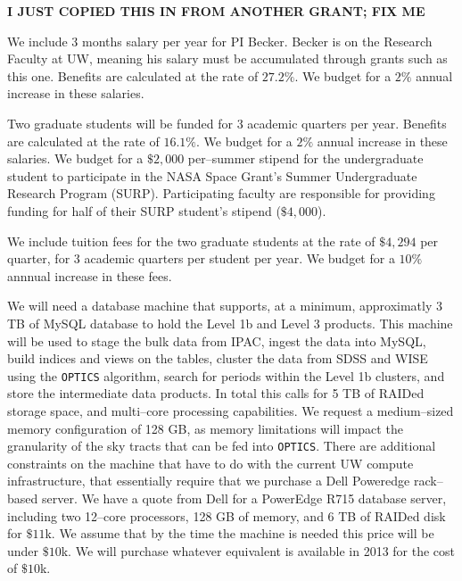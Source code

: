 {\bf I JUST COPIED THIS IN FROM ANOTHER GRANT; FIX ME}

\bigskip {} 

We include 3 months salary per year for PI Becker. Becker is on the
Research Faculty at UW, meaning his salary must be accumulated through
grants such as this one.  Benefits are calculated at the rate of
$27.2\%$.  We budget for a $2\%$ annual increase in these salaries.

\bigskip {} 

Two graduate students will be funded for 3 academic quarters per year.
Benefits are calculated at the rate of $16.1\%$.  We budget for a
$2\%$ annual increase in these salaries.  We budget for a $\$2,000$
per--summer stipend for the undergraduate student to participate in
the NASA Space Grant's Summer Undergraduate Research Program (SURP).
Participating faculty are responsible for providing funding for half
of their SURP student's stipend ($\$4,000$).

\bigskip {} 

We include tuition fees for the two graduate students at the rate of
$\$4,294$ per quarter, for 3 academic quarters per student per year.
We budget for a $10\%$ annnual increase in these fees.

\bigskip {} 

We will need a database machine that supports, at a minimum,
approximatly 3 TB of MySQL database to hold the Level 1b and Level 3
products.  This machine will be used to stage the bulk data from IPAC,
ingest the data into MySQL, build indices and views on the tables,
cluster the data from SDSS and WISE using the {\tt OPTICS} algorithm,
search for periods within the Level 1b clusters, and store the
intermediate data products.  In total this calls for 5 TB of RAIDed
storage space, and multi--core processing capabilities.  We request a
medium--sized memory configuration of 128 GB, as memory limitations
will impact the granularity of the sky tracts that can be fed into
{\tt OPTICS}.  There are additional constraints on the machine that
have to do with the current UW compute infrastructure, that
essentially require that we purchase a Dell Poweredge rack--based
server.  We have a quote from Dell for a PowerEdge R715 database
server, including two 12--core processors, 128 GB of memory, and 6 TB
of RAIDed disk for $\$11$k.  We assume that by the time the machine is
needed this price will be under $\$10$k.  We will purchase whatever
equivalent is available in 2013 for the cost of $\$10$k.

